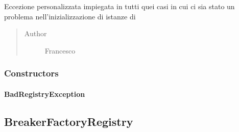 \documentclass[letterpaper,10pt,italian]{sphinxmanual}
\begin{document}
\begin{fulllineitems}
\label{\detokenize{source/it/unicam/cs/pa/mastermind/players/BadRegistryException:it.unicam.cs.pa.mastermind.players.BadRegistryException}}
Eccezione personalizzata impiegata in tutti quei casi in cui ci sia stato un problema nell’inizializzazione di istanze di 
\begin{quote}\begin{description}
\item[{Author}] \leavevmode
Francesco

\end{description}\end{quote}

\end{fulllineitems}



\subsubsection{Constructors}
\label{\detokenize{source/it/unicam/cs/pa/mastermind/players/BadRegistryException:constructors}}

\paragraph{BadRegistryException}
\label{\detokenize{source/it/unicam/cs/pa/mastermind/players/BadRegistryException:id1}}

\begin{fulllineitems}
\label{\detokenize{source/it/unicam/cs/pa/mastermind/players/BadRegistryException:it.unicam.cs.pa.mastermind.players.BadRegistryException.BadRegistryException(String)}}
\end{fulllineitems}



\subsection{BreakerFactoryRegistry}
\label{\detokenize{source/it/unicam/cs/pa/mastermind/players/BreakerFactoryRegistry:breakerfactoryregistry}}\label{\detokenize{source/it/unicam/cs/pa/mastermind/players/BreakerFactoryRegistry::doc}}
\end{document}
